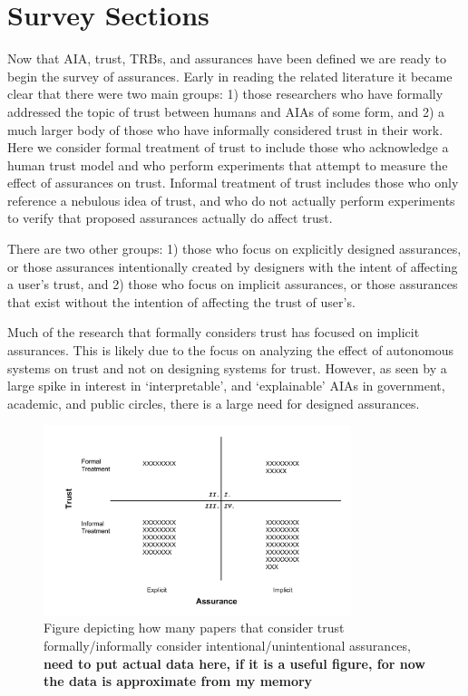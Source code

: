 \section{Survey Sections} \label{sec:survey}
Now that AIA, trust, TRBs, and assurances have been defined we are ready to begin the survey of assurances. Early in reading the related literature it became clear that there were two main groups: 1) those researchers who have formally addressed the topic of trust between humans and AIAs of some form, and 2) a much larger body of those who have informally considered trust in their work. Here we consider formal treatment of trust to include those who acknowledge a human trust model and who perform experiments that attempt to measure the effect of assurances on trust. Informal treatment of trust includes those who only reference a nebulous idea of trust, and who do not actually perform experiments to verify that proposed assurances actually do affect trust. 

There are two other  groups: 1) those who focus on explicitly designed assurances, or those assurances intentionally created by designers with the intent of affecting a user's trust, and 2) those who focus on implicit assurances, or those assurances that exist without the intention of affecting the trust of user's.

Much of the research that formally considers trust has focused on implicit assurances. This is likely due to the focus on analyzing the effect of autonomous systems on trust and not on designing systems for trust. However, as seen by a large spike in interest in `interpretable', and `explainable' AIAs in government, academic, and public circles, there is a large need for designed assurances.

\begin{figure}[htbp]
    \centering
    \includegraphics[width=0.8\textwidth]{Figures/Trust_vs_Assurance_Intention.pdf}
    \caption{Figure depicting how many papers that consider trust formally/informally consider intentional/unintentional assurances, \textbf{need to put actual data here, if it is a useful figure, for now the data is approximate from my memory}}
    \label{fig:trust_assurance_intention}
\end{figure}

